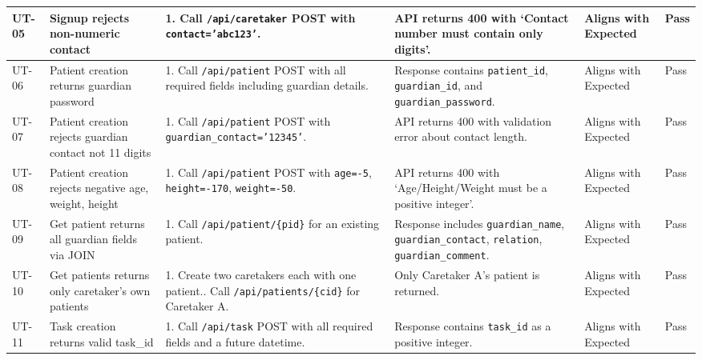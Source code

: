 \documentclass[12pt,a4paper]{article}
\begin{document}
\begin{longtable}{|p{1cm}|p{2.5cm}|p{3.5cm}|p{3.5cm}|p{2cm}|p{1.2cm}|}
    UT-05 & Signup rejects non-numeric contact &
        1. Call \texttt{/api/caretaker} POST with \texttt{contact='abc123'}. &
        API returns 400 with `Contact number must contain only digits'. &
        Aligns with Expected & Pass \\
    \hline
 
    UT-06 & Patient creation returns guardian password &
        1. Call \texttt{/api/patient} POST with all required fields including guardian details. &
        Response contains \texttt{patient\_id}, \texttt{guardian\_id}, and \texttt{guardian\_password}. &
        Aligns with Expected & Pass \\
    \hline
 
    UT-07 & Patient creation rejects guardian contact not 11 digits &
        1. Call \texttt{/api/patient} POST with \texttt{guardian\_contact='12345'}. &
        API returns 400 with validation error about contact length. &
        Aligns with Expected & Pass \\
    \hline
 
    UT-08 & Patient creation rejects negative age, weight, height &
        1. Call \texttt{/api/patient} POST with \texttt{age=-5}, \texttt{height=-170}, \texttt{weight=-50}. &
        API returns 400 with `Age/Height/Weight must be a positive integer'. &
        Aligns with Expected & Pass \\
    \hline
 
    UT-09 & Get patient returns all guardian fields via JOIN &
        1. Call \texttt{/api/patient/\{pid\}} for an existing patient. &
        Response includes \texttt{guardian\_name}, \texttt{guardian\_contact}, \texttt{relation}, \texttt{guardian\_comment}. &
        Aligns with Expected & Pass \\
    \hline
 
    UT-10 & Get patients returns only caretaker's own patients &
        1. Create two caretakers each with one patient.\newline
        2. Call \texttt{/api/patients/\{cid\}} for Caretaker A. &
        Only Caretaker A's patient is returned. &
        Aligns with Expected & Pass \\
    \hline
 
    UT-11 & Task creation returns valid task\_id &
        1. Call \texttt{/api/task} POST with all required fields and a future datetime. &
        Response contains \texttt{task\_id} as a positive integer. &
        Aligns with Expected & Pass \\
    \hline
 

\end{longtable}
\end{document}
